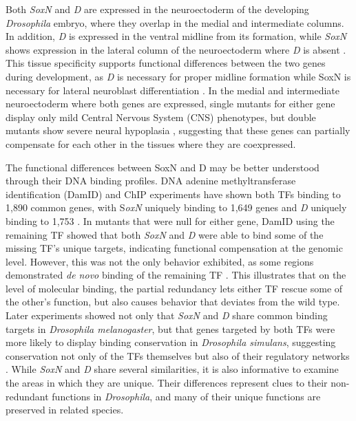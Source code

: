 \documentclass[withindex,glossary]{cam-thesis}
\begin{document}
Both \emph{SoxN} and \emph{D} are expressed in the neuroectoderm of the
developing \emph{Drosophila} embryo, where they overlap in the medial
and intermediate columns. In addition, \emph{D} is expressed in the
ventral midline from its formation, while \emph{SoxN} shows expression
in the lateral column of the neuroectoderm where \emph{D} is absent
. This tissue
specificity supports functional differences between the two genes during
development, as \emph{D} is necessary for proper midline formation
 while SoxN is necessary for lateral
neuroblast differentiation . In the medial and
intermediate neuroectoderm where both genes are expressed, single
mutants for either gene display only mild Central Nervous System (\gls{CNS})
phenotypes, but double mutants show severe neural hypoplasia , suggesting that these genes can
partially compensate for each other in the tissues where they are
coexpressed.

The functional differences between SoxN and D may be better understood
through their DNA binding profiles. DNA adenine methyltransferase
identification (DamID) and ChIP experiments have shown both TFs binding
to 1,890 common genes, with S\emph{oxN} uniquely binding to 1,649 genes
and \emph{D} uniquely binding to 1,753 . In
mutants that were null for either gene, DamID using the remaining TF
showed that both \emph{SoxN} and \emph{D} were able to bind some of the
missing TF's unique targets, indicating functional compensation at the
genomic level. However, this was not the only behavior exhibited, as
some regions demonstrated \emph{de novo} binding of the remaining TF
. This illustrates that on the level of molecular
binding, the partial redundancy lets either TF rescue some of the
other's function, but also causes behavior that deviates from the wild
type. Later experiments showed not only that \emph{SoxN} and \emph{D}
share common binding targets in \emph{Drosophila melanogaster}, but that
genes targeted by both TFs were more likely to display binding
conservation in \emph{Drosophila simulans}, suggesting conservation not
only of the TFs themselves but also of their regulatory networks . While \emph{SoxN} and \emph{D} share several
similarities, it is also informative to examine the areas in which they
are unique. Their differences represent clues to their non-redundant
functions in \emph{Drosophila}, and many of their unique functions are
preserved in related species.
\end{document}
